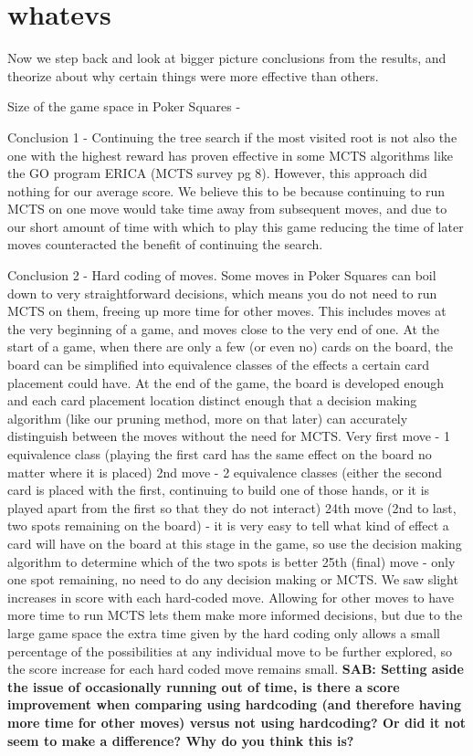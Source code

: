 \documentclass[letterpaper]{article}
\begin{document}
\section{whatevs}

Now we step back and look at bigger picture conclusions from the results, and theorize about why certain things were more effective than others.

Size of the game space in Poker Squares - 

Conclusion 1 - Continuing the tree search if the most visited root is not also the one with the highest reward has proven effective in some MCTS algorithms like the GO program ERICA (MCTS survey pg 8). However, this approach did nothing for our average score. We believe this to be because continuing to run MCTS on one move would take time away from subsequent moves, and due to our short amount of time with which to play this game reducing the time of later moves counteracted the benefit of continuing the search.

Conclusion 2 - Hard coding of moves. Some moves in Poker Squares can boil down to very straightforward decisions, which means you do not need to run MCTS on them, freeing up more time for other moves. This includes moves at the very beginning of a game, and moves close to the very end of one. At the start of a game, when there are only a few (or even no) cards on the board, the board can be simplified into equivalence classes of the effects a certain card placement could have. At the end of the game, the board is developed enough and each card placement location distinct enough that a decision making algorithm (like our pruning method, more on that later) can accurately distinguish between the moves without the need for MCTS.
	Very first move - 1 equivalence class (playing the first card has the same effect on the board no matter where it is placed)
	2nd move - 2 equivalence classes (either the second card is placed with the first, continuing to build one of those hands, or it is played apart from the first so that they do not interact)
	24th move (2nd to last, two spots remaining on the board) - it is very easy to tell what kind of effect a card will have on the board at this stage in the game, so use the decision making algorithm to determine which of the two spots is better
	25th (final) move - only one spot remaining, no need to do any decision making or MCTS.
We saw slight increases in score with each hard-coded move. Allowing for other moves to have more time to run MCTS lets them make more informed decisions, but due to the large game space the extra time given by the hard coding only allows a small percentage of the possibilities at any individual move to be further explored, so the score increase for each hard coded move remains small.
{\bf SAB: Setting aside the issue of occasionally running out of time, is there a score improvement when comparing using hardcoding (and therefore having more time for other moves) versus not using hardcoding? Or did it not seem to make a difference? Why do you think this is?}
\end{document}
